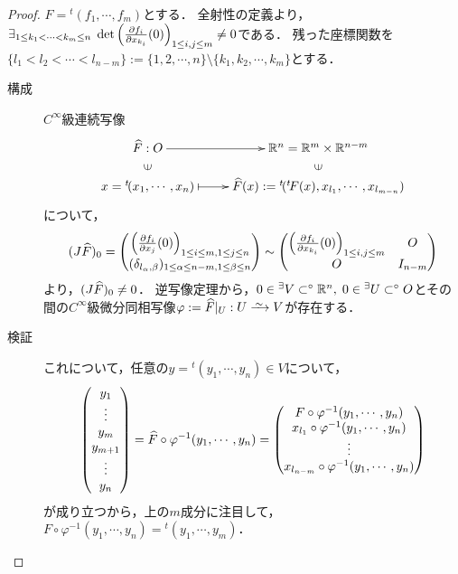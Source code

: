 \documentclass[uplatex,dvipdfmx]{jsreport}
\begin{document}
\begin{proof}
    $F={}^t\!(f_1,\cdots,f_m)$とする．
    全射性の定義より，$\exists_{1\le k_1<\cdots< k_m\le n}\;\det\left(\frac{\partial f_i}{\partial x_{k_i}}(0)\right)_{1\le i,j\le m}\ne 0$である．
    残った座標関数を$\{l_1<l_2<\cdots<l_{n-m}\}:=\{1,2,\cdots,n\}\setminus\{k_1,k_2,\cdots,k_m\}$とする．
    \begin{description}
        \item[構成] $C^\infty$級連続写像
    \[\xymatrix@R-2pc{
        \widehat{F}:O\ar[r]&\R^n=\R^m\times\R^{n-m}\\
        \rotatebox[origin=c]{90}{$\in$}&\rotatebox[origin=c]{90}{$\in$}\\
        x={}^t\!(x_1,\cdots,x_n)\ar@{|->}[r]&\widehat{F}(x):={}^t\!({}^t\!F(x),x_{l_1},\cdots,x_{l_{m-n}})
    }\]
        について，
        \[(J\widehat{F})_0=\begin{pmatrix}\left(\frac{\partial f_i}{\partial x_{j}}(0)\right)_{1\le i\le m, 1\le j\le n}\\(\delta_{l_\alpha,\beta})_{1\le\alpha\le n-m, 1\le\beta\le n}\end{pmatrix}\sim\begin{pmatrix}\left(\frac{\partial f_i}{\partial x_{k_i}}(0)\right)_{1\le i,j\le m}&O\\O&I_{n-m}\end{pmatrix}\]
        より，$(J\widehat{F})_0\ne 0$．
        逆写像定理から，$0\in{}^{\exists}V\subset^\circ\mathbb{R}^n,\;0\in{}^\exists U\subset^\circ O$とその間の$C^\infty$級微分同相写像$\varphi:=\wh{F}|_U:U\iso V$が存在する．
        \item[検証]
        これについて，任意の$y={}^t\!(y_1,\cdots,y_n)\in V$について，
        \[\begin{pmatrix}y_1\\\vdots\\y_m\\y_{m+1}\\\vdots\\y_n\end{pmatrix}=\widehat{F}\circ\varphi^{-1}(y_1,\cdots,y_n)=\begin{pmatrix}F\circ\varphi^{-1}(y_1,\cdots,y_n)\\x_{l_1}\circ\varphi^{-1}(y_1,\cdots,y_n)\\\vdots\\x_{l_{n-m}}\circ\varphi^{-1}(y_1,\cdots,y_n)\end{pmatrix}\]
        が成り立つから，上の$m$成分に注目して，$F\circ\varphi^{-1}(y_1,\cdots,y_n)={}^t\!(y_1,\cdots,y_m)$．
    \end{description}
\end{proof}
\end{document}
